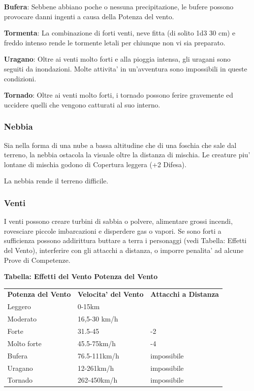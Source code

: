 \documentclass[a4paper,11pt,twoside,openany]{book}
\begin{document}
{\textbf{Bufera}: Sebbene abbiano poche o nessuna precipitazione, le bufere possono provocare danni ingenti a causa della Potenza del vento.

\textbf{Tormenta}: La combinazione di forti venti, neve fitta (di solito 1d3 \texttimes{} 30 cm) e freddo intenso rende le tormente letali per chiunque non vi sia preparato. 

\textbf{Uragano}: Oltre ai venti molto forti e alla pioggia intensa, gli uragani sono seguiti da inondazioni. Molte attivita' in un'avventura sono impossibili in queste condizioni.

\textbf{Tornado}: Oltre ai venti molto forti, i tornado possono ferire gravemente ed uccidere quelli che vengono catturati al suo interno.

\subsubsection{Nebbia}

\label{nebbia}

Sia nella forma di una nube a bassa altitudine che di una foschia che sale dal terreno, la nebbia ostacola la visuale oltre la distanza di mischia. Le creature piu' lontane di mischia godono di Copertura leggera (+2 Difesa).

La nebbia rende il terreno difficile.


\subsubsection{Venti}

\label{venti}

I venti possono creare turbini di sabbia o polvere, alimentare grossi incendi, rovesciare piccole imbarcazioni e disperdere gas o vapori. Se sono forti a sufficienza possono addirittura buttare a terra i personaggi (vedi Tabella: Effetti del Vento), interferire con gli attacchi a distanza, o imporre penalita' ad alcune Prove di Competenze.

\textbf{Tabella: Effetti del Vento Potenza del Vento}

\medskip

\begin{tabular}{lll}
\toprule
\textbf{Potenza del Vento} & \textbf{Velocita' del Vento} & \textbf{Attacchi a Distanza}\\
Leggero & 0-15km \tabularnewline
Moderato & 16,5-30 km/h  \tabularnewline
Forte & 31.5-45 & -2 \tabularnewline
Molto forte & 45.5-75km/h & -4 \tabularnewline
Bufera & 76.5-111km/h & impossibile  \tabularnewline
Uragano & 12-261km/h & impossibile \tabularnewline
Tornado & 262-450km/h & impossibile\tabularnewline
\end{tabular}

}
\end{document}
